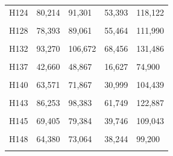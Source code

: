 \documentclass[
  a4paper,
  titlepage]{article}
\begin{document}
\begin{longtable}[t]{lllll}
H124 & 80,214 & 91,301 & 53,393 & 118,122\\
 
\cellcolor{gray!6}{H127} & \cellcolor{gray!6}{76,607} & \cellcolor{gray!6}{87,535} & \cellcolor{gray!6}{50,775} & \cellcolor{gray!6}{113,367}\\
 
H128 & 78,393 & 89,061 & 55,464 & 111,990\\
 
\cellcolor{gray!6}{H129} & \cellcolor{gray!6}{58,066} & \cellcolor{gray!6}{67,175} & \cellcolor{gray!6}{32,467} & \cellcolor{gray!6}{92,774}\\
 
H132 & 93,270 & 106,672 & 68,456 & 131,486\\
 
\cellcolor{gray!6}{H135} & \cellcolor{gray!6}{64,249} & \cellcolor{gray!6}{73,036} & \cellcolor{gray!6}{33,550} & \cellcolor{gray!6}{103,735}\\
 
H137 & 42,660 & 48,867 & 16,627 & 74,900\\
 
\cellcolor{gray!6}{H138} & \cellcolor{gray!6}{74,194} & \cellcolor{gray!6}{84,369} & \cellcolor{gray!6}{40,786} & \cellcolor{gray!6}{117,777}\\
 
H140 & 63,571 & 71,867 & 30,999 & 104,439\\
 
\cellcolor{gray!6}{H142} & \cellcolor{gray!6}{56,796} & \cellcolor{gray!6}{64,629} & \cellcolor{gray!6}{31,727} & \cellcolor{gray!6}{89,698}\\
 
H143 & 86,253 & 98,383 & 61,749 & 122,887\\
 
\cellcolor{gray!6}{H144} & \cellcolor{gray!6}{81,677} & \cellcolor{gray!6}{93,606} & \cellcolor{gray!6}{54,535} & \cellcolor{gray!6}{120,748}\\
 
H145 & 69,405 & 79,384 & 39,746 & 109,043\\
 
\cellcolor{gray!6}{H146} & \cellcolor{gray!6}{67,440} & \cellcolor{gray!6}{77,795} & \cellcolor{gray!6}{41,750} & \cellcolor{gray!6}{103,485}\\
 
H148 & 64,380 & 73,064 & 38,244 & 99,200\\
 
\cellcolor{gray!6}{H149} & \cellcolor{gray!6}{62,962} & \cellcolor{gray!6}{72,070} & \cellcolor{gray!6}{32,349} & \cellcolor{gray!6}{102,683}\\
 

\end{longtable}
\end{document}
